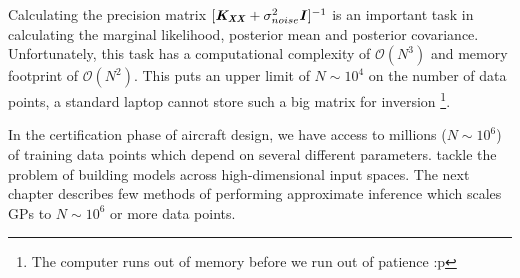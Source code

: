 Calculating the precision matrix $[\bm{\mathit{K_{XX}}}+ \sigma_{noise}^{2}\bm{\mathit{I}}]^{-1}$ is an important task in calculating the marginal likelihood, posterior mean and posterior covariance. Unfortunately, this task has a computational complexity of $\mathcal{O}\left ( N^{3} \right )$ and memory footprint of $\mathcal{O}\left ( N^{2} \right )$. This puts an upper limit of $N \sim 10^4$ on the number of data points, a standard laptop cannot store such a big matrix for inversion \footnote{The computer runs out of memory before we run out of patience :p}. 

In the certification phase of aircraft design, we have access to millions ($N \sim 10^6$) of training data points which depend on several different parameters. \cite{bouhlel2016improved} tackle the problem of building models across high-dimensional input spaces. The next chapter describes few methods of performing approximate inference which scales GPs to $N \sim 10^6$ or more data points. 

